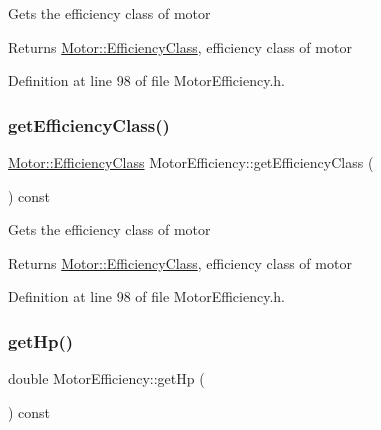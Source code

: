 Gets the efficiency class of motor

\begin{DoxyReturn}{Returns}
\hyperlink{class_motor_afa022971ae062406a9f588c601673d4e}{Motor\+::\+Efficiency\+Class}, efficiency class of motor 
\end{DoxyReturn}


Definition at line 98 of file Motor\+Efficiency.\+h.

\mbox{\label{class_motor_efficiency_a9eb7d5c2fc598f655c1a3d12790e4d17}} 
\subsubsection{\texorpdfstring{get\+Efficiency\+Class()}{getEfficiencyClass()}\hspace{0.1cm}{\footnotesize\ttfamily [3/3]}}
{\footnotesize\ttfamily \hyperlink{class_motor_afa022971ae062406a9f588c601673d4e}{Motor\+::\+Efficiency\+Class} Motor\+Efficiency\+::get\+Efficiency\+Class (\begin{DoxyParamCaption}{ }\end{DoxyParamCaption}) const\hspace{0.3cm}{\ttfamily [inline]}}

Gets the efficiency class of motor

\begin{DoxyReturn}{Returns}
\hyperlink{class_motor_afa022971ae062406a9f588c601673d4e}{Motor\+::\+Efficiency\+Class}, efficiency class of motor 
\end{DoxyReturn}


Definition at line 98 of file Motor\+Efficiency.\+h.

\mbox{\label{class_motor_efficiency_a9f88159c82daa270975d7969debe88a9}} 
\subsubsection{\texorpdfstring{get\+Hp()}{getHp()}\hspace{0.1cm}{\footnotesize\ttfamily [1/3]}}
{\footnotesize\ttfamily double Motor\+Efficiency\+::get\+Hp (\begin{DoxyParamCaption}{ }\end{DoxyParamCaption}) const\hspace{0.3cm}{\ttfamily [inline]}}

